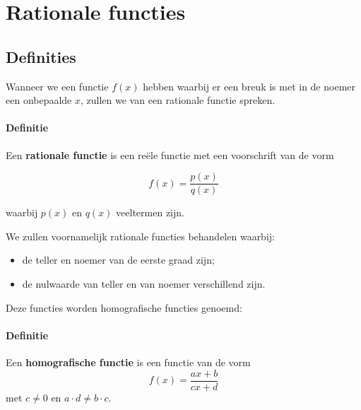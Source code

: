 \documentclass[12pt]{article}
\begin{document}
\pagebreak
\section{Rationale functies}

\begin{theorie}

\subsection{Definities}

Wanneer we een functie $f(x)$ hebben waarbij er een breuk is met in de noemer een onbepaalde $x$, zullen we van een rationale functie spreken.

\paragraph*{Definitie}
\begin{mdframed}
Een {\bf rationale functie} is een reële functie met een voorschrift van de vorm

$$f(x)=\dfrac{p(x)}{q(x)}$$

waarbij $p(x)$ en $q(x)$ veeltermen zijn.
\end{mdframed}

We zullen voornamelijk rationale functies behandelen waarbij:
\begin{itemize}
  \item de teller en noemer van de eerste graad zijn;
  \item de nulwaarde van teller en van noemer verschillend zijn.
\end{itemize}
Deze functies worden homografische functies genoemd:

\paragraph*{Definitie}
\begin{mdframed}
Een {\bf homografische functie} is een functie van de vorm
$$f(x)=\dfrac{ax+b}{cx+d}$$
met $c\neq 0$ en $a\cdot d\neq b\cdot c$.
\end{mdframed}

\end{theorie}
\end{document}
